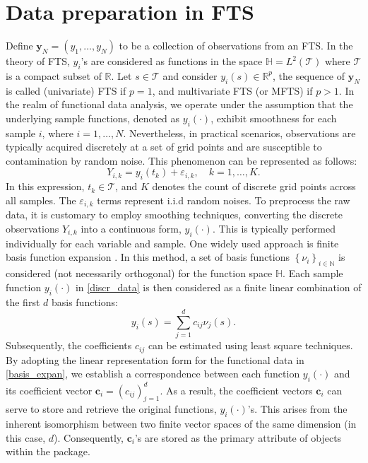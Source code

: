 \section{Data preparation in FTS}\label{sec:preparation}
Define $\textbf{y}_N=(y_1,\ldots,y_N)$ to be a collection of observations from an FTS. In the theory of FTS, $y_i$'s are considered as functions in the space $\mathbb{H}=L^2(\mathcal{T})$ where $\mathcal{T}$ is a compact subset of $\mathbb{R}.$ Let $s\in\mathcal{T}$ and consider $y_i(s)\in\mathbb{R}^p$, the sequence of $\textbf{y}_N$ is called (univariate) FTS if $p=1$, and multivariate FTS (or MFTS) if $p>1.$ 
In the realm of functional data analysis, we operate under the assumption that the underlying sample functions, denoted as $y_{i}(\cdot)$, exhibit smoothness for each sample $i$, where $i=1, \ldots, N$. Nevertheless, in practical scenarios, observations are typically acquired discretely at a set of grid points and are susceptible to contamination by random noise. This phenomenon can be represented as follows:
\begin{equation}\label{discr_data}
	Y_{i,k} = y_{i}(t_k) +\varepsilon_{i,k}, \quad k=1,\ldots, K.
\end{equation}
In this expression, $t_k\in\mathcal{T}$, and $K$ denotes the count of discrete grid points across all samples. The $\varepsilon_{i,k}$ terms represent i.i.d random noises.
To preprocess the raw data, it is customary to employ smoothing techniques, converting the discrete observations $Y_{i,k}$ into a continuous form, $y_{i}(\cdot)$. This is typically performed individually for each variable and sample. One widely used approach is finite basis function expansion \citep{ramsay2005}. In this method, a set of basis functions $\left\lbrace \nu_i \right\rbrace_{ i\in\mathbb{N}}$ is considered (not necessarily orthogonal) for the function space $\mathbb{H}$. Each sample function $y_{i}(\cdot)$ in \eqref{discr_data} is then considered as a finite linear combination of the first $d$ basis functions:
\begin{equation}\label{basis_expan}
	y_i(s)= \sum_{j=1}^d c_{ij}\nu_j(s).
\end{equation}
Subsequently, the coefficients $c_{ij}$ can be estimated using least square techniques. By adopting the linear representation form for the functional data in \eqref{basis_expan}, we establish a correspondence between each function $y_i(\cdot)$ and its coefficient vector ${\pmb c}_i=(c_{ij})_{j=1}^d.$ As a result, the coefficient vectors ${\pmb c}_i$ can serve to store and retrieve the original functions, $y_i(\cdot)$'s. This arises from the inherent isomorphism between two finite vector spaces of the same dimension (in this case, $d$). Consequently, ${\pmb c}_i$'s are stored as the primary attribute of  objects within the  package.

